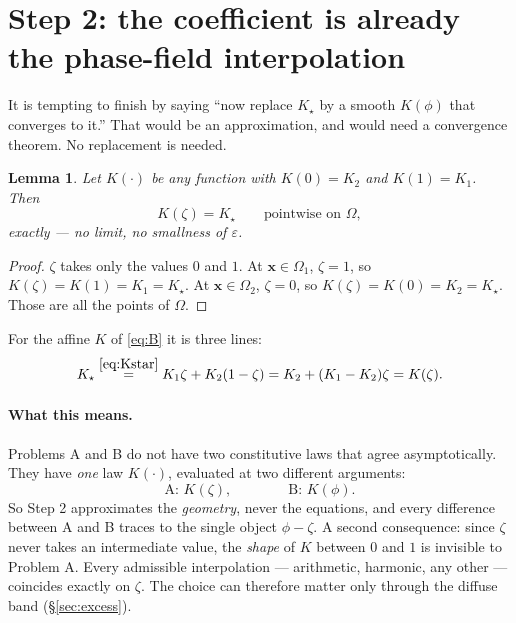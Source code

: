 \documentclass[11pt]{article}
\newtheorem{lemma}{Lemma}
\newcommand{\Om}{\Omega}
\newcommand{\ind}{\zeta}  %
\begin{document}
\section{Step 2: the coefficient is already the phase-field interpolation}
\label{sec:step2}

It is tempting to finish by saying ``now replace $K_\star$ by a smooth $K(\phi)$
that converges to it.'' That would be an approximation, and would need a
convergence theorem. No replacement is needed.

\begin{lemma}\label{lem:identity}
Let $K(\cdot)$ be \emph{any} function with $K(0)=K_2$ and $K(1)=K_1$. Then
\begin{equation}
K(\ind)=K_\star \qquad\text{pointwise on }\Om,
\label{eq:identity}
\end{equation}
exactly --- no limit, no smallness of $\varepsilon$.
\end{lemma}

\begin{proof}
$\ind$ takes only the values $0$ and $1$. At $\mathbf x\in\Om_1$, $\ind=1$, so
$K(\ind)=K(1)=K_1=K_\star$. At $\mathbf x\in\Om_2$, $\ind=0$, so
$K(\ind)=K(0)=K_2=K_\star$. Those are all the points of $\Om$.
\end{proof}

\noindent
For the affine $K$ of \eqref{eq:B} it is three lines:
\begin{equation}
K_\star \overset{\eqref{eq:Kstar}}{=} K_1\ind+K_2(1-\ind)=K_2+(K_1-K_2)\ind=K(\ind).
\label{eq:algebra}
\end{equation}

\paragraph{What this means.} Problems A and B do not have two constitutive laws
that agree asymptotically. They have \emph{one} law $K(\cdot)$, evaluated at two
different arguments:
\[
\text{A: }K(\ind),\qquad\qquad \text{B: }K(\phi).
\]
So Step 2 approximates the \emph{geometry}, never the equations, and every
difference between A and B traces to the single object $\phi-\ind$. A second
consequence: since $\ind$ never takes an intermediate value, the \emph{shape} of
$K$ between $0$ and $1$ is invisible to Problem A. Every admissible
interpolation --- arithmetic, harmonic, any other --- coincides exactly on
$\ind$. The choice can therefore matter only through the diffuse band
(\S\ref{sec:excess}).
\end{document}
